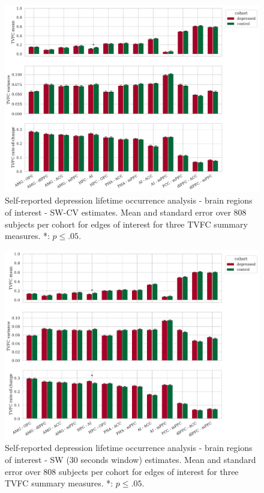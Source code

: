 \begin{figure}[h]
    \centering
    \includegraphics[width=\textwidth]{fig/ukbiobank/TVFC_predictions_summaries/lifetime_occurrence/cohort_comparison/ROI/correlation_all_TVFC_summary_measures_SW_cross_validated_edges_of_interest}
    \caption{
        Self-reported depression lifetime occurrence analysis - brain regions of interest - SW-CV estimates.
        Mean and standard error over 808 subjects per cohort for edges of interest for three TVFC summary measures.
        *: $p \leq .05$.
    }\label{fig:ukb-results-lo-roi-cohort-comparison-edges-of-interest-sw-cv}
\end{figure}


\begin{figure}[h]
    \centering
    \includegraphics[width=\textwidth]{fig/ukbiobank/TVFC_predictions_summaries/lifetime_occurrence/cohort_comparison/ROI/correlation_all_TVFC_summary_measures_SW_30_edges_of_interest}
    \caption{
        Self-reported depression lifetime occurrence analysis - brain regions of interest - SW (30 seconds window) estimates.
        Mean and standard error over 808 subjects per cohort for edges of interest for three TVFC summary measures.
        *: $p \leq .05$.
    }\label{fig:ukb-results-lo-roi-cohort-comparison-edges-of-interest-sw-30}
\end{figure}



